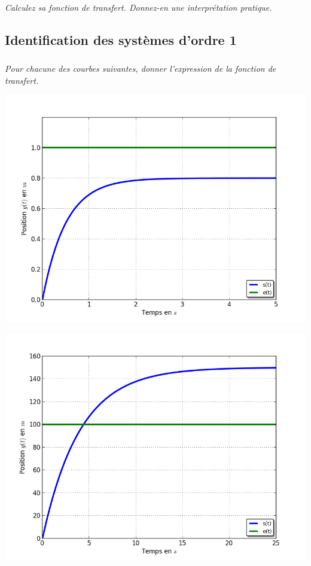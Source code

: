 \documentclass[11pt,oneside]{article}
\begin{document}
\subparagraph{}
\textit{Calculez sa fonction de transfert. Donnez-en une interprétation pratique.}




\subsection*{Identification des systèmes d'ordre 1}

\subparagraph*{}
\textit{Pour chacune des courbes suivantes, donner l'expression de la fonction de transfert.}

\begin{minipage}[c]{.49\linewidth}
\begin{center}
\includegraphics[width=\textwidth]{png/courbe1}
\end{center}
\end{minipage}\hfill
\begin{minipage}[c]{.49\linewidth}
\begin{center}
\includegraphics[width=\textwidth]{png/courbe2}
\end{center}
\end{minipage}
\end{document}
